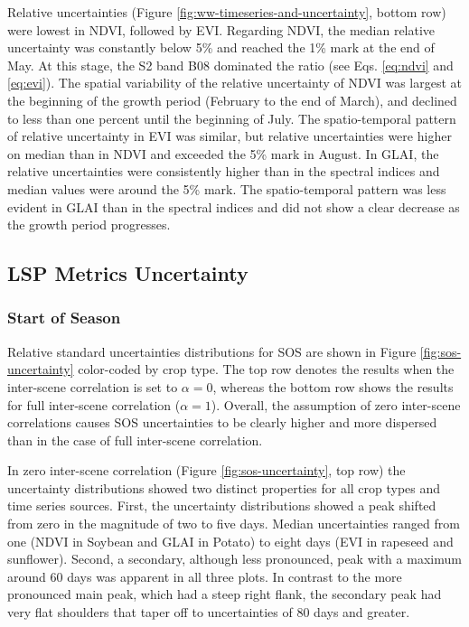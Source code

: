 Relative uncertainties (Figure \ref{fig:ww-timeseries-and-uncertainty}, bottom row) were lowest in NDVI, followed by EVI. Regarding NDVI, the median relative uncertainty was constantly below 5\% and reached the 1\% mark at the end of May. At this stage, the \gls{S2} band B08 dominated the ratio (see Eqs. \ref{eq:ndvi} and \ref{eq:evi}). The spatial variability of the relative uncertainty of \gls{NDVI} was largest at the beginning of the growth period (February to the end of March), and declined to less than one percent until the beginning of July. The spatio-temporal pattern of relative uncertainty in \gls{EVI} was similar, but relative uncertainties were higher on median than in \gls{NDVI} and exceeded the 5\% mark in August. In GLAI, the relative uncertainties were consistently higher than in the spectral indices and median values were around the 5\% mark. The spatio-temporal pattern was less evident in \gls{GLAI} than in the spectral indices and did not show a clear decrease as the growth period progresses.

\subsection{LSP Metrics Uncertainty}
\label{subsec:lsp-metrics}
\subsubsection{Start of Season}

Relative standard uncertainties distributions for \gls{SOS} are shown in Figure \ref{fig:sos-uncertainty} color-coded by crop type. The top row denotes the results when the inter-scene correlation is set to $\alpha=0$, whereas the bottom row shows the results for full inter-scene correlation ($\alpha=1$). Overall, the assumption of zero inter-scene correlations causes \gls{SOS} uncertainties to be clearly higher and more dispersed than in the case of full inter-scene correlation.

In zero inter-scene correlation (Figure \ref{fig:sos-uncertainty}, top row) the uncertainty distributions showed two distinct properties for all crop types and time series sources. First, the uncertainty distributions showed a peak shifted from zero in the magnitude of two to five days. Median uncertainties ranged from one (\gls{NDVI}  in Soybean and \gls{GLAI} in Potato) to eight days (\gls{EVI}  in rapeseed and sunflower). Second, a secondary, although less pronounced, peak with a maximum around 60 days was apparent in all three plots. In contrast to the more pronounced main peak, which had a steep right flank, the secondary peak had very flat shoulders that taper off to uncertainties of 80 days and greater.

